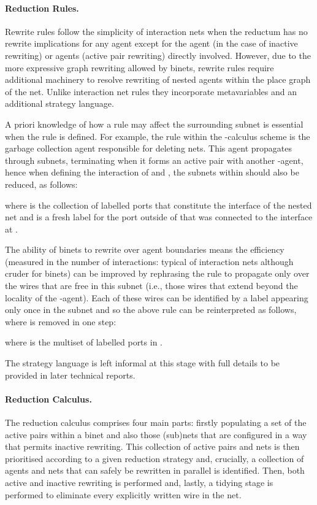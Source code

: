 \documentclass[copyright,creativecommons]{eptcs}
\begin{document}
\paragraph{Reduction Rules.}
Rewrite rules follow the simplicity of interaction nets when the
reductum has no rewrite implications for any agent except for the
agent (in the case of inactive rewriting) or agents (active pair
  rewriting) directly involved.  However, due to the more expressive
graph rewriting allowed by binets, rewrite rules require additional
machinery to resolve rewriting of nested agents within the place graph
of the net. Unlike interaction net rules they incorporate
metavariables and an additional strategy language.

A priori knowledge of how a rule may affect the surrounding subnet is essential when the rule is defined.  For example, the  rule within the -calculus scheme is the garbage collection agent responsible for deleting nets.  This agent propagates through subnets, terminating when it forms an active pair with another -agent, hence when defining the interaction of  and , the subnets within  should also be reduced, as follows:
 
where  is the collection of labelled ports that constitute
the interface of the nested net  and  is a fresh label for
the port outside of  that was connected to the interface at .

The ability of binets to rewrite over agent boundaries means the
efficiency (measured in the number of interactions: typical of
interaction nets although cruder for binets) can be improved by
rephrasing the rule to propagate  only over the wires that
are free in this subnet (i.e., those wires that extend beyond the
locality of the -agent).  Each of these wires can be identified by a
label appearing only once in the subnet  and so the above rule can
be reinterpreted as follows, where  is removed in one step:

where  is the multiset of labelled ports in .

The strategy language is left informal at this stage with full details
to be provided in later technical reports.

\paragraph{Reduction Calculus.}
The reduction calculus comprises four main parts: firstly populating
a set of the active pairs within a binet and also those (sub)nets that
are configured in a way that permits inactive rewriting.
This collection of active pairs and nets is then prioritised according
to a given reduction strategy and, crucially, a collection of agents and nets that can safely be
rewritten in parallel is identified.  Then, both active and
inactive rewriting is performed and, lastly, a tidying stage is
performed to eliminate every explicitly written wire in the net.
\end{document}
